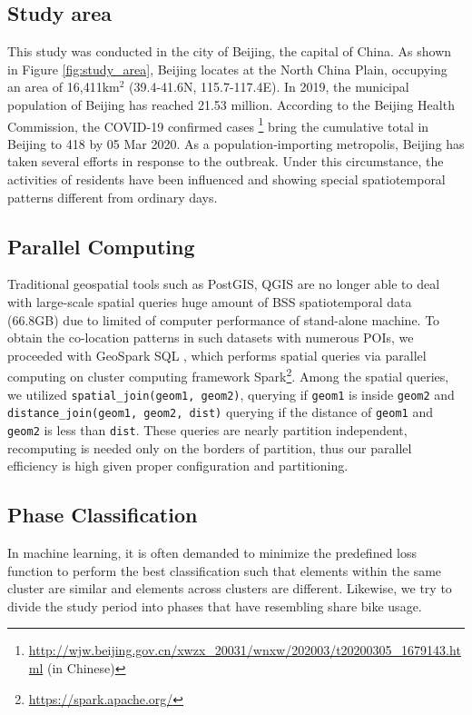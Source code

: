 \documentclass[ijgi,submit,moreauthors,pdftex]{Definitions/mdpi}
\begin{document}
\subsection{Study area}
This study was conducted in the city of Beijing, the capital of China.
As shown in Figure \ref{fig:study_area}, Beijing locates at the North China Plain, occupying an area of 16,411km$^2$ (39.4{\degree}-41.6{\degree}N, 115.7{\degree}-117.4{\degree}E).
In 2019, the municipal population of Beijing has reached 21.53 million. According to the Beijing Health Commission, the COVID-19 confirmed cases \footnote{\url{http://wjw.beijing.gov.cn/xwzx_20031/wnxw/202003/t20200305_1679143.html} (in Chinese)} bring the cumulative total in Beijing to 418 by 05 Mar 2020.
As a population-importing metropolis, Beijing has taken several efforts in response to the outbreak. 
Under this circumstance, the activities of residents have been influenced and showing special spatiotemporal patterns different from ordinary days.


\subsection{Parallel Computing}
Traditional geospatial tools such as PostGIS, QGIS are no longer able to deal with large-scale spatial queries huge amount of BSS spatiotemporal data (66.8GB) due to limited of computer performance of stand-alone machine.
To obtain the co-location patterns in such datasets with numerous POIs, we proceeded with GeoSpark SQL \cite{huang2017geospark}, which performs spatial queries via parallel computing on cluster computing framework Spark\footnote{\url{https://spark.apache.org/}}.
Among the spatial queries, we utilized \texttt{spatial\_join(geom1, geom2)}, querying if \texttt{geom1} is inside \texttt{geom2} and \texttt{distance\_join(geom1, geom2, dist)} querying if the distance of \texttt{geom1} and \texttt{geom2} is less than \texttt{dist}.
These queries are nearly partition independent, recomputing is needed only on the borders of partition, thus our parallel efficiency is high given proper configuration and partitioning.

\subsection{Phase Classification}\label{sec:phase_classification}
In machine learning, it is often demanded to minimize the predefined loss function to perform the best classification such that elements within the same cluster are similar and elements across clusters are different.
Likewise, we try to divide the study period into phases that have resembling share bike usage.
\end{document}
